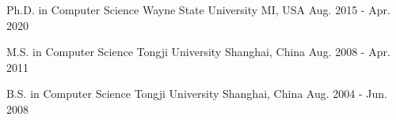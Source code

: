 

\begin{mcventries}

  \mcventry
    {Ph.D. in Computer Science} %
    {Wayne State University} %
    {MI, USA} %
    {Aug. 2015 - Apr. 2020} %
    {
    }

    \vspace{-10pt}
  \mcventry
    {M.S. in Computer Science} %
    {Tongji University} %
    {Shanghai, China} %
    {Aug. 2008 - Apr. 2011} %
    {
    }

    \vspace{-10pt}
  \mcventry
    {B.S. in Computer Science} %
    {Tongji University} %
    {Shanghai, China} %
    {Aug. 2004 - Jun. 2008} %
    {
    }
    
    \vspace{-10pt}
\end{mcventries}
